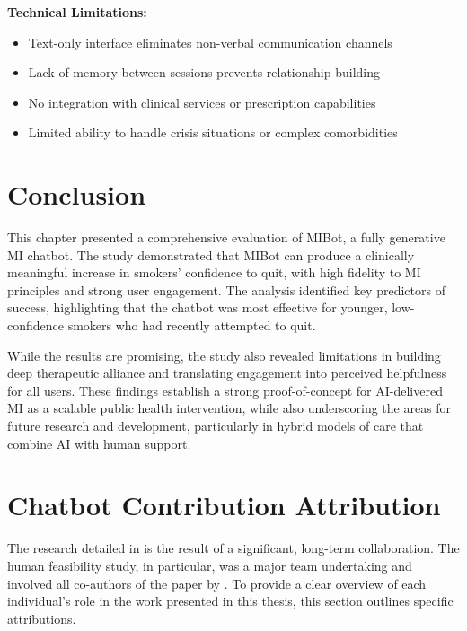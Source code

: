 \textbf{Technical Limitations:}
\begin{itemize}
\item Text-only interface eliminates non-verbal communication channels
\item Lack of memory between sessions prevents relationship building
\item No integration with clinical services or prescription capabilities
\item Limited ability to handle crisis situations or complex comorbidities
\end{itemize}

\section{Conclusion}
\label{sec:conclusion}

This chapter presented a comprehensive evaluation of MIBot, a fully generative MI chatbot. The study demonstrated that MIBot can produce a clinically meaningful increase in smokers' confidence to quit, with high fidelity to MI principles and strong user engagement. The analysis identified key predictors of success, highlighting that the chatbot was most effective for younger, low-confidence smokers who had recently attempted to quit.

While the results are promising, the study also revealed limitations in building deep therapeutic alliance and translating engagement into perceived helpfulness for all users. These findings establish a strong proof-of-concept for AI-delivered MI as a scalable public health intervention, while also underscoring the areas for future research and development, particularly in hybrid models of care that combine AI with human support.


\section*{Chatbot Contribution Attribution}

The research detailed in  is the result of a significant, long-term collaboration. The human feasibility study, in particular, was a major team undertaking and involved all co-authors of the paper by \citet{mahmood-etal-2025-fully}. To provide a clear overview of each individual's role in the work presented in this thesis, this section outlines specific attributions.


